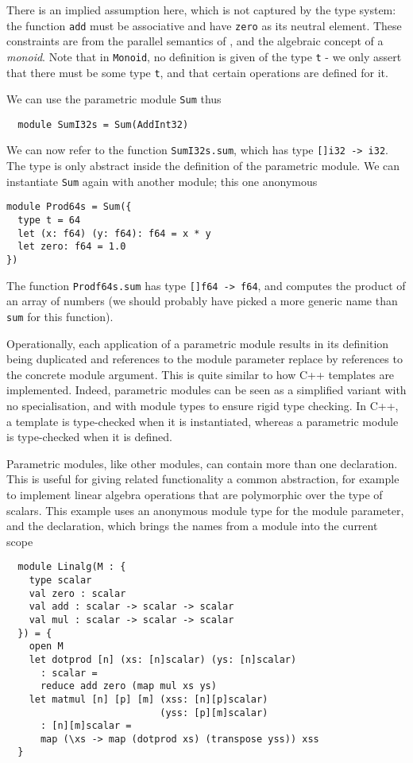 \documentclass[oneside,11pt]{book}
\begin{document}
There is an implied assumption here, which is not captured by the type
system: the function \texttt{add} must be associative and have
\texttt{zero} as its neutral element.  These constraints are from the
parallel semantics of , and the algebraic concept of a
\textit{monoid}.  Note that in \texttt{Monoid}, no definition is given
of the type \texttt{t} - we only assert that there must be some type
\texttt{t}, and that certain operations are defined for it.

We can use the parametric module \texttt{Sum} thus

\begin{lstlisting}
  module SumI32s = Sum(AddInt32)
\end{lstlisting}

We can now refer to the function \texttt{SumI32s.sum}, which has type
\texttt{[]i32 -> i32}.  The type is only abstract inside the definition of
the parametric module.  We can instantiate \texttt{Sum} again with
another module; this one anonymous

\begin{lstlisting}
module Prod64s = Sum({
  type t = 64
  let (x: f64) (y: f64): f64 = x * y
  let zero: f64 = 1.0
})
\end{lstlisting}

The function \texttt{Prodf64s.sum} has type \texttt{[]f64 -> f64}, and computes
the product of an array of numbers (we should probably have picked a
more generic name than \texttt{sum} for this function).

Operationally, each application of a parametric module results in
its definition being duplicated and references to the module parameter
replace by references to the concrete module argument.  This is quite
similar to how C++ templates are implemented.  Indeed, parametric
modules can be seen as a simplified variant with no specialisation,
and with module types to ensure rigid type checking.  In C++, a
template is type-checked when it is instantiated, whereas a
parametric module is type-checked when it is defined.

Parametric modules, like other modules, can contain more than one
declaration.  This is useful for giving related functionality a common
abstraction, for example to implement linear algebra operations that
are polymorphic over the type of scalars.  This example uses an
anonymous module type for the module parameter, and the 
declaration, which brings the names from a module into the current
scope

\begin{lstlisting}
  module Linalg(M : {
    type scalar
    val zero : scalar
    val add : scalar -> scalar -> scalar
    val mul : scalar -> scalar -> scalar
  }) = {
    open M
    let dotprod [n] (xs: [n]scalar) (ys: [n]scalar)
      : scalar =
      reduce add zero (map mul xs ys)
    let matmul [n] [p] [m] (xss: [n][p]scalar)
                           (yss: [p][m]scalar)
      : [n][m]scalar =
      map (\xs -> map (dotprod xs) (transpose yss)) xss
  }
\end{lstlisting}
\end{document}
